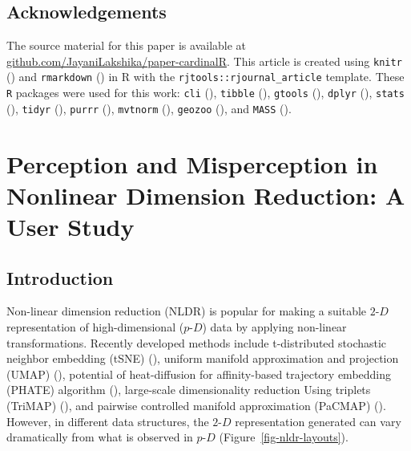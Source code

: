 \documentclass[
  11pt,
  a4paper,
]{report}
\newcommand\pD{$p\text{-}D$}
\newcommand\gD{$2\text{-}D$}
\begin{document}
\section{Acknowledgements}\label{acknowledgements-2}

The source material for this paper is available at
\href{https://github.com/JayaniLakshika/paper-cardinalR}{github.com/JayaniLakshika/paper-cardinalR}.
This article is created using \texttt{knitr}
() and \texttt{rmarkdown}
() in R with the
\texttt{rjtools::rjournal\_article} template. These \texttt{R} packages
were used for this work: \texttt{cli}
(), \texttt{tibble}
(), \texttt{gtools}
(), \texttt{dplyr}
(), \texttt{stats}
(), \texttt{tidyr}
(), \texttt{purrr}
(), \texttt{mvtnorm}
(), \texttt{geozoo}
(), and \texttt{MASS}
().


\chapter{Perception and Misperception in Nonlinear Dimension Reduction:
A User Study}\label{sec-second-paper}

\section{Introduction}\label{introduction-3}

Non-linear dimension reduction (NLDR) is popular for making a suitable
\gD{} representation of high-dimensional (\pD{}) data by applying
non-linear transformations. Recently developed methods include
t-distributed stochastic neighbor embedding (tSNE)
(), uniform manifold
approximation and projection (UMAP) (), potential of heat-diffusion for affinity-based trajectory
embedding (PHATE) algorithm (),
large-scale dimensionality reduction Using triplets (TriMAP)
(), and pairwise
controlled manifold approximation (PaCMAP)
(). However, in different
data structures, the \gD{} representation generated can vary
dramatically from what is observed in \pD{}
(Figure~\ref{fig-nldr-layouts}).
\end{document}
